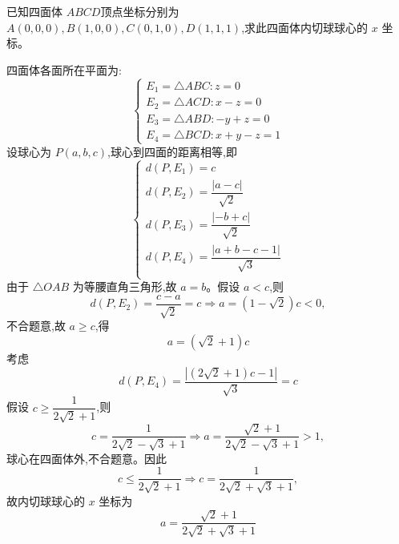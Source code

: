 \begin{questions}
    \question 已知四面体 $ABCD$顶点坐标分别为 $A(0,0,0),B(1,0,0),C(0,1,0),D(1,1,1)$,求此四面体内切球球心的 $x$ 坐标。
    \begin{solution}
        四面体各面所在平面为:
        \[
        \begin{cases}
        E_1 = \triangle ABC: z=0 \\
        E_2 = \triangle ACD: x - z = 0 \\
        E_3 = \triangle ABD: -y + z = 0 \\
        E_4 = \triangle BCD: x + y - z = 1
        \end{cases}
        \]
        设球心为 $P(a,b,c)$,球心到四面的距离相等,即
        \[
        \begin{cases}
        d(P,E_1) = c \\[4pt]
        d(P,E_2) = \dfrac{|a - c|}{\sqrt{2}} \\[6pt]
        d(P,E_3) = \dfrac{| - b + c|}{\sqrt{2}} \\[6pt]
        d(P,E_4) = \dfrac{|a + b - c - 1|}{\sqrt{3}}\\[6pt]
        \end{cases}
        \]
        由于 $\triangle OAB$ 为等腰直角三角形,故 $a = b$。假设 $a < c$,则
        \[
        d(P,E_2) = \frac{c - a}{\sqrt{2}} = c \Rightarrow a = (1 - \sqrt{2}) c < 0,
        \]
        不合题意,故 $a \ge c$,得
        \[
        a = (\sqrt{2} + 1) c
        \]
        考虑
        \[
        d(P,E_4) = \frac{|(2 \sqrt{2} + 1) c - 1|}{\sqrt{3}} = c
        \]
        假设 $c \ge \dfrac{1}{2 \sqrt{2} + 1}$,则
        \[
        c = \frac{1}{2 \sqrt{2} - \sqrt{3} + 1} \Rightarrow a = \frac{\sqrt{2} + 1}{2 \sqrt{2} - \sqrt{3} + 1} > 1,
        \]
        球心在四面体外,不合题意。因此
        \[
        c \le \frac{1}{2 \sqrt{2} + 1} \Rightarrow c = \frac{1}{2 \sqrt{2} + \sqrt{3} + 1},
        \]
        故内切球球心的 $x$ 坐标为
        \[
        a=\frac{\sqrt{2} + 1}{2 \sqrt{2} + \sqrt{3} + 1}
        \]
    \end{solution}


\end{questions}
